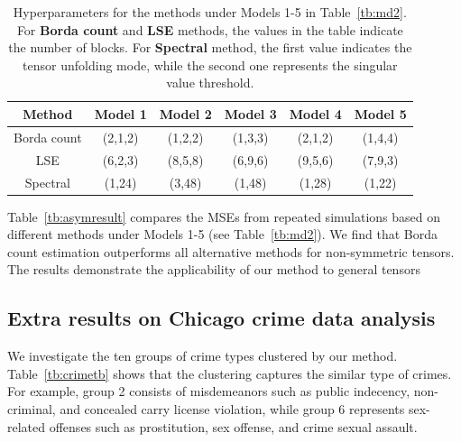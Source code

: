 \documentclass[12pt]{article}
\theoremstyle{definition}
\begin{document}
\begin{table}[ht]
    \centering
    \begin{tabular}{c|c|c|c|c|c}
        Method &  Model 1 & Model 2 & Model 3& Model 4 & Model 5  \\\hline
        Borda count &   (2,1,2)&(1,2,2)& (1,3,3) &(2,1,2)&(1,4,4)\\
        LSE &(6,2,3)&(8,5,8)&(6,9,6)&(9,5,6)&(7,9,3)\\
        Spectral & (1,24)&(3,48)&(1,48)&(1,28)&(1,22)
    \end{tabular}
    \caption{Hyperparameters for the methods under Models 1-5 in Table~\ref{tb:md2}. For {\bf \small Borda count} and {\bf \small LSE} methods, the values in the table indicate the number of blocks. For {\bf \small Spectral} method, the first value indicates the tensor unfolding mode, while the second one represents the singular value threshold.}
    \label{tb:hyper}
\end{table}

 Table~\ref{tb:asymresult} compares the MSEs from repeated simulations based on different methods under Models 1-5 (see Table~\ref{tb:md2}). We find that Borda count estimation outperforms all alternative methods for non-symmetric tensors. 
The results demonstrate the applicability of our method to general tensors


\begin{table}[ht]
\centering
{}
    \caption{MSEs from 20 repeated simulations based on different methods. All numbers are displayed on the scales $10^{-3}$. Standard errors are reported in parenthesis.}
    \label{tb:asymresult}
\end{table}

 

\subsection{Extra results on Chicago crime data analysis}\label{subsec:chicago}
We investigate the ten groups of crime types clustered by our method. Table~\ref{tb:crimetb} shows that the clustering captures the similar type of crimes. For example, group 2 consists of misdemeanors such as public indecency, non-criminal, and concealed carry license violation, while group 6 represents sex-related offenses such as prostitution, sex offense, and crime sexual assault.
\end{document}
